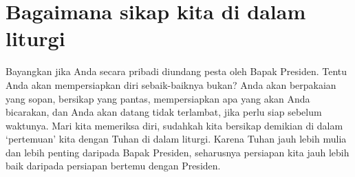\section*{Bagaimana sikap kita di dalam liturgi}

Bayangkan jika Anda secara pribadi diundang pesta oleh Bapak Presiden. Tentu Anda akan mempersiapkan diri sebaik-baiknya bukan? Anda akan berpakaian yang sopan, bersikap yang pantas, mempersiapkan apa yang akan Anda bicarakan, dan Anda akan datang tidak terlambat, jika perlu siap sebelum waktunya. Mari kita memeriksa diri, sudahkah kita bersikap demikian di dalam ‘pertemuan’ kita dengan Tuhan di dalam liturgi. Karena Tuhan jauh lebih mulia dan lebih penting daripada Bapak Presiden, seharusnya persiapan kita jauh lebih baik daripada persiapan bertemu dengan Presiden.
\\{~}\\
